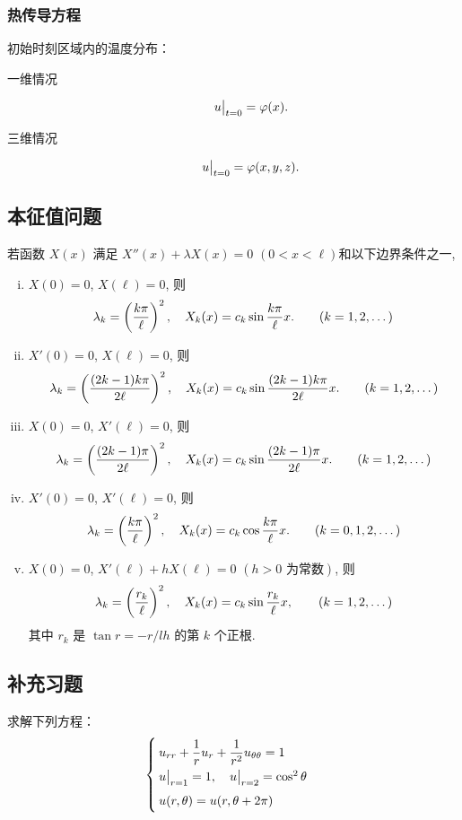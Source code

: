 \subsubsection{热传导方程}
初始时刻区域内的温度分布：
\begin{description}
	\item[一维情况]
	\[
		\eval[1]{u}_{t = 0} = \varphi(x).
	\]
	
	\item[三维情况]
	\[
		\eval[1]{u}_{t = 0} = \varphi(x,y,z).
	\]
\end{description}

\subsection{本征值问题}
若函数 $X(x)$ 满足 $X''(x) + \lambda X(x) = 0$ $(0 < x < \ell)$和以下边界条件之一, 
\begin{enumerate}[i)]
	\item $X(0) = 0$, $X(\ell) = 0$, 则
	\[
		\lambda_k = \del[3]{\frac{k \pi}{\ell}}^2, \quad
		X_k(x) = c_k \sin \frac{k \pi}{\ell}x. \qquad (k = 1,2,\dotsc)
	\]

	\item $X'(0) = 0$, $X(\ell) = 0$, 则
	\[
		\lambda_k = \del[3]{\frac{(2k - 1)k \pi}{2 \ell}}^2, \quad
		X_k(x) = c_k \sin \frac{(2k - 1)k \pi}{2 \ell}x. \qquad (k = 1,2,\dotsc)
	\]
	
	\item $X(0) = 0$, $X'(\ell) = 0$, 则
	\[
		\lambda_k = \del[3]{\frac{(2k - 1) \pi}{2 \ell}}^2, \quad
		X_k(x) = c_k \sin \frac{(2k - 1) \pi}{2 \ell}x. \qquad (k = 1,2,\dotsc)
	\]
	
	\item $X'(0) = 0$, $X'(\ell) = 0$, 则
	\[
		\lambda_k = \del[3]{\frac{k \pi}{\ell}}^2, \quad
		X_k(x) = c_k \cos \frac{k \pi}{\ell}x. \qquad (k = 0,1,2,\dotsc)
	\]
	
	\item $X(0) = 0$, $X'(\ell) + hX(\ell)= 0$ $(h>0 \text{ 为常数})$, 则
	\[
		\lambda_k = \del[3]{\frac{r_k}{\ell}}^2, \quad
		X_k(x) = c_k \sin \frac{r_k}{\ell}x, \qquad (k = 1,2,\dotsc)
	\]
	其中 $r_k$ 是 $\tan r = -r / lh$ 的第 $k$ 个正根.
\end{enumerate}

\subsection{补充习题}
\begin{exercise}[141223补充练习题]
求解下列方程：
\[\begin{cases}
	u_{rr} + \dfrac 1r u_r + \dfrac{1}{r^2} u_{\theta \theta} = 1 \\[5pt]
	\eval[1]{u}_{r = 1} = 1,\quad \eval[1]{u}_{r = 2} = \cos^2 \theta \\[5pt]
	u(r,\theta) = u(r,\theta + 2\pi)
\end{cases}\]
\end{exercise}

